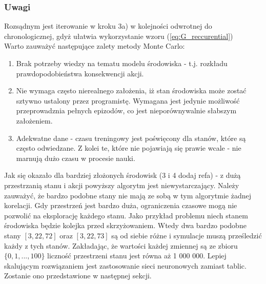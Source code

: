 \documentclass[12pt]{book}
\theoremstyle{plain}
\begin{document}
\subsubsection{Uwagi}
Rozsądnym jest iterowanie w kroku 3a) w kolejności odwrotnej do chronologicznej, gdyż ułatwia wykorzystanie wzoru (\ref{eq:G_reccurential})
\\ Warto zauważyć następujące zalety metody Monte Carlo:
\begin{enumerate}
	\item Brak potrzeby wiedzy na tematu modelu środowiska - t.j. rozkładu prawdopodobieństwa konsekwencji akcji.
	\item Nie wymaga często nierealnego założenia, iż stan środowiska może zostać sztywno ustalony przez programistę. Wymagana jest jedynie możliwość przeprowadznia pełnych epizodów, co jest nieporównywalnie słabszym założeniem.
	\item Adekwatne dane - czasu treningowy jest poświęcony dla stanów, które są często odwiedzane. Z kolei te, które nie pojawiają się prawie wcale - nie marnują dużo czasu w procesie nauki.
\end{enumerate}
Jak się okazało dla bardziej złożonych środowisk (3 i 4 dodaj refa) - z dużą przestrzanią stanu i akcji powyższy algorytm jest niewystarczający. Należy zauważyć, że bardzo podobne stany nie mają ze sobą w tym algorytmie żadnej korelacji. Gdy przestrzeń jest bardzo duża, ograniczenia czasowe mogą nie pozwolić na eksplorację każdego stanu. Jako przykład problemu niech stanem środowiska będzie kolejka przed skrzyżowaniem. Wtedy dwa bardzo podobne stany $[3,22,72]$ oraz $[3,22,73]$ są od siebie różne i symulacje muszą prześledzić każdy z tych stanów. Zakładając, że wartości każdej zmiennej są ze zbioru $\{0,1,...,100\}$ liczność przestrzeni stanu jest równa aż 1 000 000. Lepiej skalującym rozwiązaniem jest zastosowanie sieci neuronowych zamiast tablic. Zostanie ono przedstawione w następnej sekcji.
\end{document}
